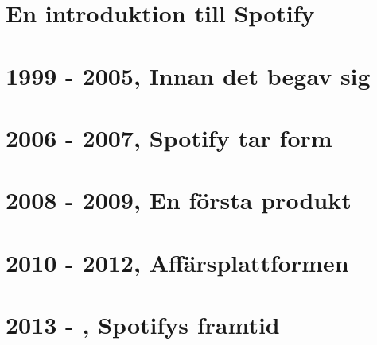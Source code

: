 \documentclass[10pt, a4paper, twoside]{article}
\numberwithin{equation}{subsection}
\numberwithin{figure}{section}
\numberwithin{table}{section}
\begin{document}



\newpage
\pagestyle{fancy}
\setcounter{page}{2} %

%

\newpage
\tableofcontents
\listoffigures

%
%
\newpage
{}


\newpage
\section{En introduktion till Spotify}
\label{sec:introduction}


\newpage
\section{1999 - 2005, Innan det begav sig}
\label{sec:earlyDevelopment}


\newpage
\section{2006 - 2007, Spotify tar form}
\label{sec:firstYears}


\newpage
\section{2008 - 2009, En första produkt}
\label{sec:firstProduct}


\newpage
\section{2010 - 2012, Affärsplattformen}
\label{sec:businessPlatform}


\newpage
\section{2013 - , Spotifys framtid}
\label{sec:future}



%
%

\newpage

\end{document}

